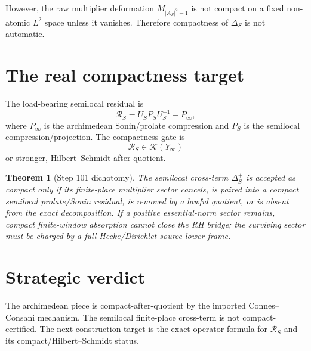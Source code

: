 \documentclass[11pt]{article}
\newtheorem{theorem}{Theorem}
\begin{document}
However, the raw multiplier deformation $M_{|A_S|^2-1}$ is not compact on a fixed non-atomic $L^2$ space unless it vanishes. Therefore compactness of $\Delta_S$ is not automatic.

\section{The real compactness target}
The load-bearing semilocal residual is
\[
  \mathcal R_S=U_S P_S U_S^{-1}-P_\infty,
\]
where $P_\infty$ is the archimedean Sonin/prolate compression and $P_S$ is the semilocal compression/projection. The compactness gate is
\[
  \mathcal R_S\in\mathcal K(Y^-_\infty)
\]
or stronger, Hilbert--Schmidt after quotient.

\begin{theorem}[Step 101 dichotomy]
The semilocal cross-term $\Delta_S^+$ is accepted as compact only if its finite-place multiplier sector cancels, is paired into a compact semilocal prolate/Sonin residual, is removed by a lawful quotient, or is absent from the exact decomposition. If a positive essential-norm sector remains, compact finite-window absorption cannot close the RH bridge; the surviving sector must be charged by a full Hecke/Dirichlet source lower frame.
\end{theorem}

\section{Strategic verdict}
The archimedean piece is compact-after-quotient by the imported Connes--Consani mechanism. The semilocal finite-place cross-term is not compact-certified. The next construction target is the exact operator formula for $\mathcal R_S$ and its compact/Hilbert--Schmidt status.
\end{document}
